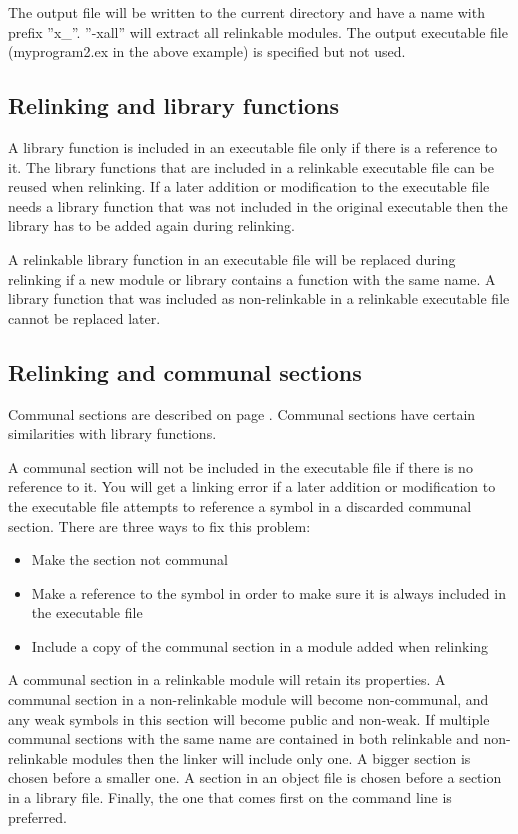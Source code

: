 \documentclass[forwardcom.tex]{subfiles}
\begin{document}
The output file will be written to the current directory and have a name with prefix ''x\_''.
''-xall'' will extract all relinkable modules.
The output executable file (myprogram2.ex in the above example) is specified but not used.
\vv

\subsection{Relinking and library functions} \label{relinkingAndLibraryFunctions}
A library function is included in an executable file only if there is a reference to it. The library functions that are included in a relinkable executable file can be reused when relinking. 
If a later addition or modification to the executable file needs a library function that was not included in the original executable then the library has to be added again during relinking.
\vv

A relinkable library function in an executable file will be replaced during relinking if a new module or library contains a function with the same name. A library function that was included as non-relinkable in a relinkable executable file cannot be replaced later.
\vv


\subsection{Relinking and communal sections} \label{relinkingAndCommunalSections}
Communal sections are described on page \pageref{communal}. Communal sections have certain similarities with library functions.
\vv

A communal section will not be included in the executable file if there is no reference to it.
You will get a linking error if a later addition or modification to the executable file attempts to reference a symbol in a discarded communal section. There are three ways to fix this problem:

\begin{itemize}
\item Make the section not communal
\item Make a reference to the symbol in order to make sure it is always included in the executable file
\item Include a copy of the communal section in a module added when relinking
\end{itemize}

A communal section in a relinkable module will retain its properties. A communal section in a non-relinkable module will become non-communal, and any weak symbols in this section will become public and non-weak. If multiple communal sections with the same name are contained in both relinkable and non-relinkable modules then the linker will include only one.
A bigger section is chosen before a smaller one. A section in an object file is chosen before a section in a library file. Finally, the one that comes first on the command line is preferred.
\vv
\end{document}
